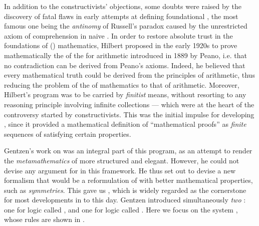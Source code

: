 In addition to the constructivists' objections, some doubts were raised by the
discovery of fatal flaws in early attempts at defining foundational
, the most famous one being the \emph{antinomy} of
Russell's paradox caused by the unrestricted axiom of comprehension in naive
. In order to restore absolute trust in the foundations of
() mathematics, Hilbert proposed in the early 1920s to prove
mathematically the  of the  for arithmetic
introduced in 1889 by Peano, i.e. that no contradiction can be derived
from Peano's axioms. Indeed, he believed that every mathematical truth could be
derived from the principles of arithmetic, thus reducing the problem of the
 of mathematics to that of arithmetic. Moreover, Hilbert's program
was to be carried by \emph{finitist} means, without resorting to any reasoning
principle involving infinite collections --- which were at the heart of the
controversy started by constructivists. This was the initial impulse for
developing , since it provided a mathematical definition of
``mathematical proofs'' as \emph{finite} sequences of  satisfying
certain properties.

Gentzen's work on  was an integral part of this program,
as an attempt to render the \emph{metamathematics} of  more
structured and elegant. However, he could not devise any argument for
 in this framework. He thus set out to devise a new formalism
that would be a reformulation of  with better mathematical
properties, such as \emph{symmetries}. This gave us ,
which is widely regarded as the cornerstone for most developments in  to this day. Gentzen introduced simultaneously \emph{two} : one for  logic called , and one for
 logic called . Here we focus on the
 system , whose rules are shown in
.

